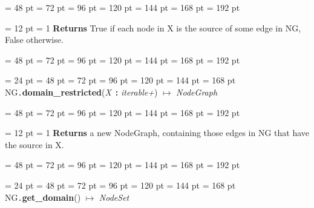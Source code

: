 {{{{\par \noindent  \leftskip = 48 pt  \leftmargini = 72 pt  \leftmarginii = 96 pt  \leftmarginiii = 120 pt  \leftmarginiv = 144 pt  \leftmarginv = 168 pt  \leftmarginvi = 192 pt {\par \noindent
{\par \pagebreak[3.100000] \noindent \hangindent = 12 pt \hangafter = 1 
{\bf Returns \/} True if each node in X is the source of some edge in NG, False otherwise.\par}
\par}
\par}
{\par \noindent  \leftskip = 48 pt  \leftmargini = 72 pt  \leftmarginii = 96 pt  \leftmarginiii = 120 pt  \leftmarginiv = 144 pt  \leftmarginv = 168 pt  \leftmarginvi = 192 pt {\par \noindent
\par}
\par}
\par}
\par}
{\par \noindent  \leftskip = 24 pt  \leftmargini = 48 pt  \leftmarginii = 72 pt  \leftmarginiii = 96 pt  \leftmarginiv = 120 pt  \leftmarginv = 144 pt  \leftmarginvi = 168 pt NG{\tt .\/}{\bf {\large {\bf domain{\_}restricted\/}}\/}({\em X\/}~{\bf :}  {\em iterable+\/}) \(\mapsto \)  {\em NodeGraph\/}{\par \noindent
{\par \noindent  \leftskip = 48 pt  \leftmargini = 72 pt  \leftmarginii = 96 pt  \leftmarginiii = 120 pt  \leftmarginiv = 144 pt  \leftmarginv = 168 pt  \leftmarginvi = 192 pt {\par \noindent
{\par \pagebreak[3.100000] \noindent \hangindent = 12 pt \hangafter = 1 
{\bf Returns \/} a new NodeGraph, containing those edges in NG that have the source in X.\par}
\par}
\par}
{\par \noindent  \leftskip = 48 pt  \leftmargini = 72 pt  \leftmarginii = 96 pt  \leftmarginiii = 120 pt  \leftmarginiv = 144 pt  \leftmarginv = 168 pt  \leftmarginvi = 192 pt {\par \noindent
\par}
\par}
\par}
\par}
{\par \noindent  \leftskip = 24 pt  \leftmargini = 48 pt  \leftmarginii = 72 pt  \leftmarginiii = 96 pt  \leftmarginiv = 120 pt  \leftmarginv = 144 pt  \leftmarginvi = 168 pt NG{\tt .\/}{\bf {\large {\bf get{\_}domain\/}}\/}() \(\mapsto \)  {\em NodeSet\/}{\par \noindent
}}}
